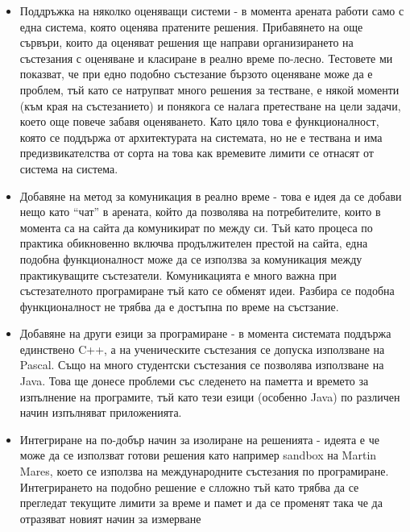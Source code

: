 \documentclass[a4paper,12pt]{article}
\begin{document}
    \begin{itemize}
      \item Поддръжка на няколко оценяващи системи - в момента арената работи само с една система, която оценява пратените решения. Прибавянето на още сървъри, които да оценяват решения ще направи организирането на състезания с оценяване и класиране в реално време по-лесно. Тестовете ми показват, че при едно подобно състезание бързото оценяване може да е проблем, тъй като се натрупват много решения за тестване, е някой моменти (към края на състезанието) и понякога се налага претестване на цели задачи, което още повече забавя оценяването. Като цяло това е функционалност, която се поддържа от архитектурата на системата, но не е тествана и има предизвикателства от сорта на това как времевите лимити се отнасят от система на система.
      \item Добавяне на метод за комуникация в реално време - това е идея да се добави нещо като ``чат'' в арената, който да позволява на потребителите, които в момента са на сайта да комуникират по между си. Тъй като процеса по практика обикновенно включва продължителен престой на сайта, една подобна функционалност може да се използва за комуникация между практикуващите състезатели. Комуникацията е много важна при състезателното програмиране тъй като се обменят идеи. Разбира се подобна функционалност не трябва да е достъпна по време на състзание.
      \item Добавяне на други езици за програмиране - в момента системата поддържа единствено C++, а на ученическите състезания се допуска използване на Pascal. Също на много студентски състезания се позволява използване на Java. Това ще донесе проблеми със следенето на паметта и времето за изпълнение на програмите, тъй като тези езици (особенно Java) по различен начин изпълняват приложенията.
      \item Интегриране на по-добър начин за изолиране на решенията - идеята е че може да се използват готови решения като например sandbox на Martin Mares, което се използва на международните състезания по програмиране. Интегрирането на подобно решение е слложно тъй като трябва да се прегледат текущите лимити за време и памет и да се променят така че да отразяват новият начин за измерване
    \end{itemize}
  
\end{document}
